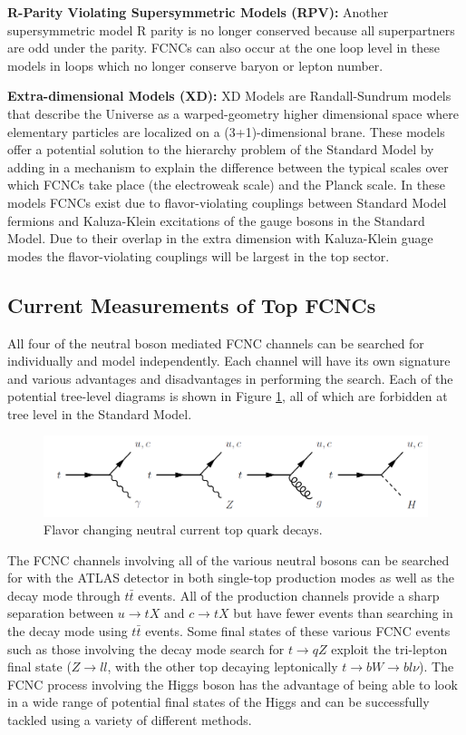 \textbf{R-Parity Violating Supersymmetric Models (RPV): }  Another supersymmetric model R parity is no longer conserved because all superpartners are odd under the parity.  FCNCs can also occur at the one loop level in these models in loops which no longer conserve baryon or lepton number\cite{RPVSusyFCNC}.

\textbf{Extra-dimensional Models (XD): }  XD Models are Randall-Sundrum models that describe the Universe as a warped-geometry higher dimensional space where elementary particles are localized on a (3+1)-dimensional brane.  These models offer a potential solution to the hierarchy problem of the Standard Model by adding in a mechanism to explain the difference between the typical scales over which FCNCs take place (the electroweak scale) and the Planck scale.  In these models FCNCs exist due to flavor-violating couplings between Standard Model fermions and Kaluza-Klein excitations of the gauge bosons in the Standard Model\cite{XDFCNC}.  Due to their overlap in the extra dimension with Kaluza-Klein guage modes the flavor-violating couplings will be largest in the top sector.


\subsection{Current Measurements of Top FCNCs}

All four of the neutral boson mediated FCNC channels can be searched for individually and model independently.  Each channel will have its own signature and various advantages and disadvantages in performing the search.  Each of the potential tree-level diagrams is shown in Figure \ref{fig:AllFCNCs}, all of which are forbidden at tree level in the Standard Model.  %
\begin{figure}[h!]
	\centering
	\includegraphics[width=\columnwidth]{../ThesisImages/Theory/AllFCNCDiagrams.png}
	\caption{Flavor changing neutral current top quark decays.}
	\label{fig:AllFCNCs}
\end{figure}

The FCNC channels involving all of the various neutral bosons can be searched for with the ATLAS detector in both single-top production modes as well as the decay mode through $t\bar{t}$ events.  All of the production channels provide a sharp separation between $u\rightarrow tX$ and $c\rightarrow tX$ but have fewer events than searching in the decay mode using $t\bar{t}$ events.  Some final states of these various FCNC events such as those involving the decay mode search for $t\rightarrow q Z$ exploit the tri-lepton final state ($Z\rightarrow ll$, with the other top decaying leptonically $t\rightarrow bW\rightarrow bl\nu$).  The FCNC process involving the Higgs boson has the advantage of being able to look in a wide range of potential final states of the Higgs and can be successfully tackled using a variety of different methods.

